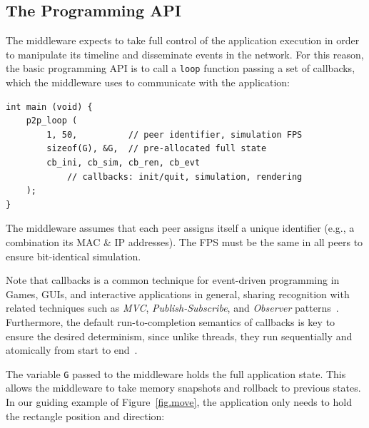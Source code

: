 \documentclass[12pt]{article}
\newcommand{\code}[1]  {\texttt{\small{#1}}}
\begin{document}
\subsection{The Programming API}
\label{sec.tml.api}

The middleware expects to take full control of the application execution in
order to manipulate its timeline and disseminate events in the network.
For this reason, the basic programming API is to call a \code{loop} function
passing a set of callbacks, which the middleware uses to communicate with the
application:

{\footnotesize
\begin{verbatim}
int main (void) {
    p2p_loop (
        1, 50,          // peer identifier, simulation FPS
        sizeof(G), &G,  // pre-allocated full state
        cb_ini, cb_sim, cb_ren, cb_evt
            // callbacks: init/quit, simulation, rendering
    );
}
\end{verbatim}
}

The middleware assumes that each peer assigns itself a unique identifier (e.g.,
a combination its MAC \& IP addresses).
The FPS must be the same in all peers to ensure bit-identical simulation.

Note that callbacks is a common technique for event-driven
programming in Games, GUIs, and interactive applications in general, sharing
recognition with related techniques such as \emph{MVC},
\emph{Publish-Subscribe}, and \emph{Observer} patterns~\cite{meyer,nystrom}.
%
Furthermore, the default run-to-completion semantics of callbacks is key to
ensure the desired determinism, since unlike threads, they run sequentially and
atomically from start to end~\cite{events,threads}.



The variable \code{G} passed to the middleware holds the full application
state.
This allows the middleware to take memory snapshots and rollback to previous
states.
In our guiding example of Figure~\ref{fig.move}, the application only needs to
hold the rectangle position and direction:
\end{document}
